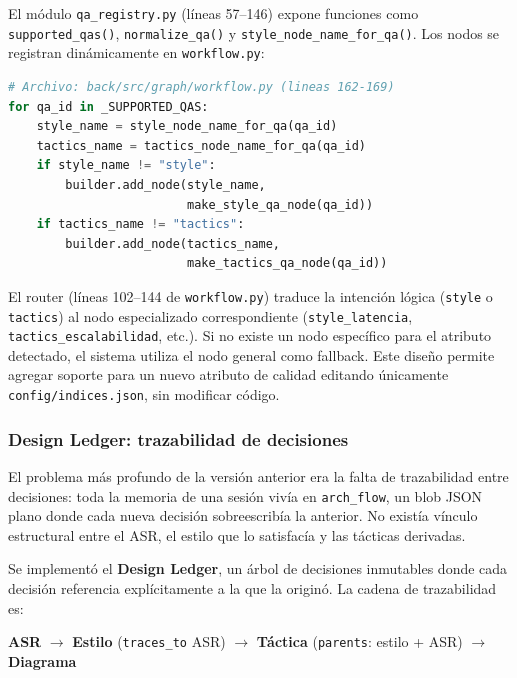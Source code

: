 \documentclass[12pt, letterpaper, oneside]{article}
\begin{document}
El módulo \texttt{qa\_registry.py} (líneas 57--146) expone funciones como
\texttt{supported\_qas()}, \texttt{normalize\_qa()} y
\texttt{style\_node\_name\_for\_qa()}. Los nodos se registran dinámicamente
en \texttt{workflow.py}:

\begin{lstlisting}[language=Python,
  caption={Registro dinámico de nodos por atributo de calidad},
  label={lst:qa-dynamic},
  firstnumber=162]
# Archivo: back/src/graph/workflow.py (lineas 162-169)
for qa_id in _SUPPORTED_QAS:
    style_name = style_node_name_for_qa(qa_id)
    tactics_name = tactics_node_name_for_qa(qa_id)
    if style_name != "style":
        builder.add_node(style_name,
                         make_style_qa_node(qa_id))
    if tactics_name != "tactics":
        builder.add_node(tactics_name,
                         make_tactics_qa_node(qa_id))
\end{lstlisting}

El router (líneas 102--144 de \texttt{workflow.py}) traduce la intención lógica
(\texttt{style} o \texttt{tactics}) al nodo especializado correspondiente
(\texttt{style\_latencia}, \texttt{tactics\_escalabilidad}, etc.). Si no existe
un nodo específico para el atributo detectado, el sistema utiliza el nodo general
como fallback. Este diseño permite agregar soporte para un nuevo atributo de
calidad editando únicamente \texttt{config/indices.json}, sin modificar código.

\subsubsection{Design Ledger: trazabilidad de decisiones}
\label{sssec:design-ledger}

El problema más profundo de la versión anterior era la falta de trazabilidad entre
decisiones: toda la memoria de una sesión vivía en \texttt{arch\_flow}, un blob
JSON plano donde cada nueva decisión sobreescribía la anterior. No existía
vínculo estructural entre el ASR, el estilo que lo satisfacía y las tácticas
derivadas.

Se implementó el \textbf{Design Ledger}, un árbol de decisiones inmutables donde
cada decisión referencia explícitamente a la que la originó. La cadena de
trazabilidad es:

\begin{center}
\textbf{ASR} $\rightarrow$ \textbf{Estilo} (\texttt{traces\_to} ASR)
$\rightarrow$ \textbf{Táctica} (\texttt{parents}: estilo + ASR)
$\rightarrow$ \textbf{Diagrama}
\end{center}
\end{document}
